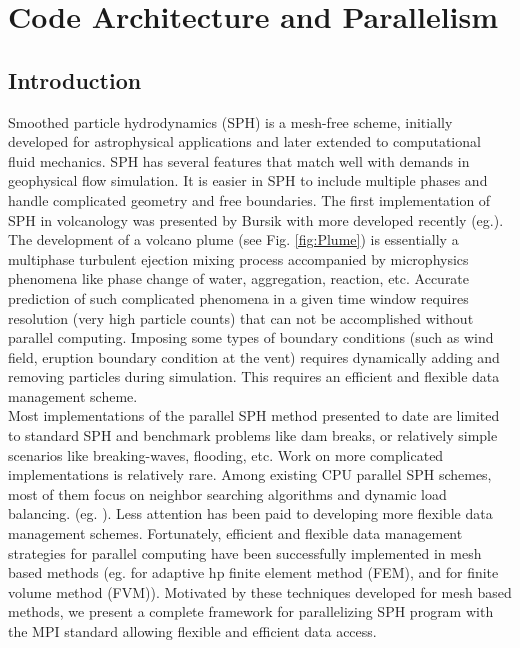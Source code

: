 \chapter{Code Architecture and Parallelism}

\section{Introduction}
\label{sect:introduction}
Smoothed particle hydrodynamics (SPH) is a mesh-free scheme, initially developed for astrophysical applications and later extended to computational fluid mechanics. SPH has several features that match well with demands in geophysical flow simulation. It is easier in SPH to include multiple phases and handle complicated geometry and free boundaries. The first implementation of SPH in volcanology was presented by Bursik \cite{bursik2003smoothed} with more developed recently (eg.\cite{ haddad2016smoothed}). The development  of a volcano plume (see Fig. \ref{fig:Plume}) is essentially a multiphase turbulent ejection mixing process accompanied by microphysics phenomena like phase change of water, aggregation, reaction, etc. Accurate prediction of such complicated phenomena in a given time window requires resolution (very high particle counts) that can not be accomplished without parallel computing. Imposing  some types of boundary conditions (such as wind field, eruption boundary condition at the vent) requires dynamically adding and removing particles during simulation. This requires an efficient and flexible data management scheme.\\
Most implementations of the parallel SPH method presented to date are limited to standard SPH and benchmark problems like dam breaks, or relatively
simple scenarios like breaking-waves, flooding, etc. Work on more complicated implementations is relatively rare. Among existing CPU parallel SPH schemes, most of them focus on neighbor searching algorithms and dynamic load balancing. (eg. \cite{ferrari2009new, crespo2015dualsphysics}). Less attention has been paid to developing more flexible data management schemes. 
Fortunately, efficient and flexible data management strategies for parallel computing have been successfully implemented in mesh based methods (eg. \cite{laszloffy2000simple} for adaptive hp finite element method (FEM), and \cite{patra2005parallel} for finite volume method (FVM)). Motivated by these techniques developed for mesh based methods, we present a complete framework for parallelizing SPH program with the MPI standard allowing flexible and efficient data access.\\
